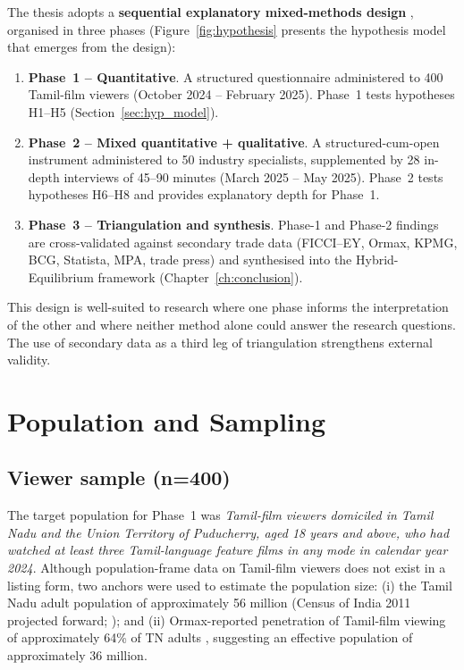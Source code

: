 The thesis adopts a \textbf{sequential explanatory mixed-methods design}
\citep{creswell2018,tashakkori2010}, organised in three phases
(Figure~\ref{fig:hypothesis} presents the hypothesis model that
emerges from the design):

\begin{enumerate}[itemsep=2pt]
\item \textbf{Phase~1 -- Quantitative}.  A structured questionnaire
      administered to 400 Tamil-film viewers (October 2024 -- February
      2025).  Phase~1 tests hypotheses H1--H5
      (Section~\ref{sec:hyp_model}).
\item \textbf{Phase~2 -- Mixed quantitative + qualitative}.  A
      structured-cum-open instrument administered to 50 industry
      specialists, supplemented by 28 in-depth interviews of
      45--90 minutes (March 2025 -- May 2025).  Phase~2 tests
      hypotheses H6--H8 and provides explanatory depth for Phase~1.
\item \textbf{Phase~3 -- Triangulation and synthesis}.  Phase-1 and
      Phase-2 findings are cross-validated against secondary trade
      data (FICCI--EY, Ormax, KPMG, BCG, Statista, MPA, trade press)
      and synthesised into the Hybrid-Equilibrium framework
      (Chapter~\ref{ch:conclusion}).
\end{enumerate}

This design is well-suited to research where one phase informs the
interpretation of the other and where neither method alone could
answer the research questions.  The use of secondary data as a
third leg of triangulation strengthens external validity.

\section{Population and Sampling}
\label{sec:sampling}

\subsection{Viewer sample (n=400)}

The target population for Phase~1 was \emph{Tamil-film viewers
domiciled in Tamil Nadu and the Union Territory of Puducherry, aged
18 years and above, who had watched at least three Tamil-language
feature films in any mode in calendar year 2024}.  Although
population-frame data on Tamil-film viewers does not exist in a
listing form, two anchors were used to estimate the population
size: (i) the Tamil Nadu adult population of approximately 56
million (Census of India 2011 projected forward; \citealp{census2011,
ficciey2024}); and (ii) Ormax-reported penetration of Tamil-film
viewing of approximately 64\% of TN adults
\citep{ormax2023,ormax2024}, suggesting an effective population of
approximately 36 million.

